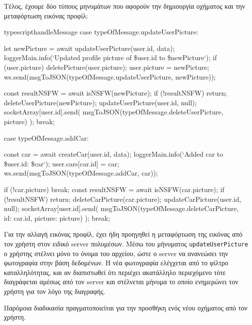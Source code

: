 \documentclass[../thesis.tex]{subfiles}
\begin{document}
Τέλος, έχουμε δύο τύπους μηνυμάτων που αφορούν την δημιουργία οχήματος και την μεταφόρτωση εικόνας προφίλ:

\begin{codeblock}{typescript}{handleMessage}
  case typeOfMessage.updateUserPicture: {
    let newPicture = await updateUserPicture(user.id, data);
    loggerMain.info(`Updated profile picture of \${user.id} to \${newPicture}`);
    if (user.picture) deletePicture(user.picture);
    user.picture = newPicture;
    ws.send(msgToJSON(typeOfMessage.updateUserPicture, newPicture));

    const resultNSFW = await isNSFW(newPicture);
    if (!resultNSFW) return;
    deleteUserPicture(newPicture);
    updateUserPicture(user.id, null);
    socketArray[user.id].send(
      msgToJSON(typeOfMessage.deleteUserPicture, picture)
    );
    break;
  }
  case typeOfMessage.addCar: {
    const car = await createCar(user.id, data);
    loggerMain.info(`Added car to \${user.id}: \${car}`);
    user.cars[car.id] = car;
    ws.send(msgToJSON(typeOfMessage.addCar, car));

    if (!car.picture) break;
    const resultNSFW = await isNSFW(car.picture);
    if (!resultNSFW) return;
    deleteCarPicture(car.picture);
    updateCarPicture(user.id, null);
    socketArray[user.id].send(
      msgToJSON(typeOfMessage.deleteCarPicture, {id: car.id, picture: picture})
    );
    break;
  }
\end{codeblock}

Για την αλλαγή εικόνας προφίλ, έχει ήδη προηγηθεί η μεταφόρτωση της εικόνας από τον χρήστη στον ειδικό server πολυμέσων.
Μέσω του μήνυματος \verb|updateUserPicture| ο χρήστης στέλνει μόνο το όνομα του αρχείου, ώστε ο server να ανανεώσει την φωτογραφία στην βάση δεδομένων.
Η νέα φωτογραφία ελέγχεται από το φίλτρο καταλληλότητας, και αν διαπιστωθεί ότι περιέχει ακατάλληλο περιεχόμενο τότε διαγράφεται αμέσως από τον server και στέλνεται μήνυμα το οποίο ενημερώνει τον χρήστη για τον λόγο της διαγραφής.

Παρόμοια διαδικασία πραγματοποιείται για την προσθήκη ενός νέου οχήματος από τον χρήστη.
\end{document}
